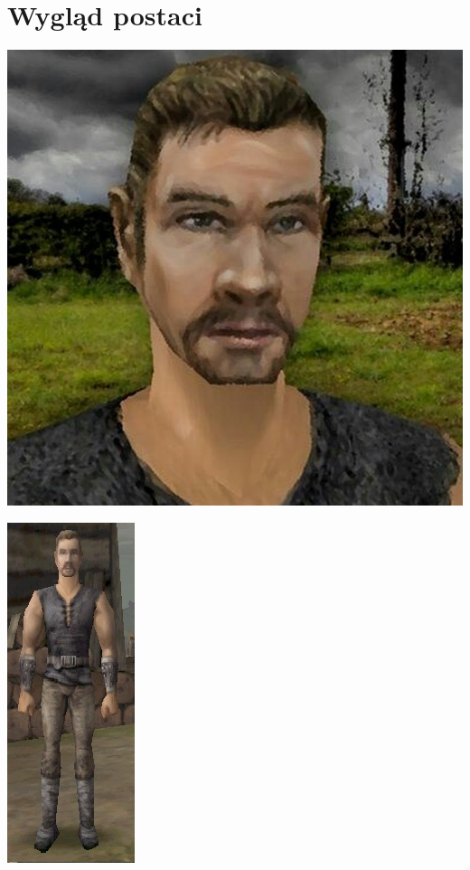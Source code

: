 \documentclass[11pt,polish, openany]{book}
\begin{document}
\section{Wygląd postaci}
\begin{center}
\includegraphics[scale=0.37]{bezimienny}
\end{center}
\begin{center}
\includegraphics[scale=2]{bezzimiennybody}
\end{center}
\end{document}
